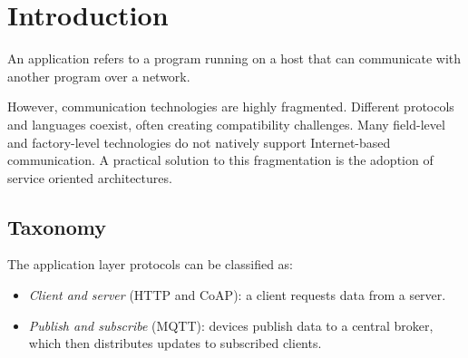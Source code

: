 \section{Introduction}

\begin{definition}
    An application refers to a program running on a host that can communicate with another program over a network.
\end{definition}
\noindent However, communication technologies are highly fragmented. 
Different protocols and languages coexist, often creating compatibility challenges. 
Many field-level and factory-level technologies do not natively support Internet-based communication.
A practical solution to this fragmentation is the adoption of service oriented architectures. 

\subsection{Taxonomy}
The application layer protocols can be classified as:
\begin{itemize}
    \item \textit{Client and server} (HTTP and CoAP): a client requests data from a server. 
    \item \textit{Publish and subscribe} (MQTT): devices publish data to a central broker, which then distributes updates to subscribed clients. 
\end{itemize}